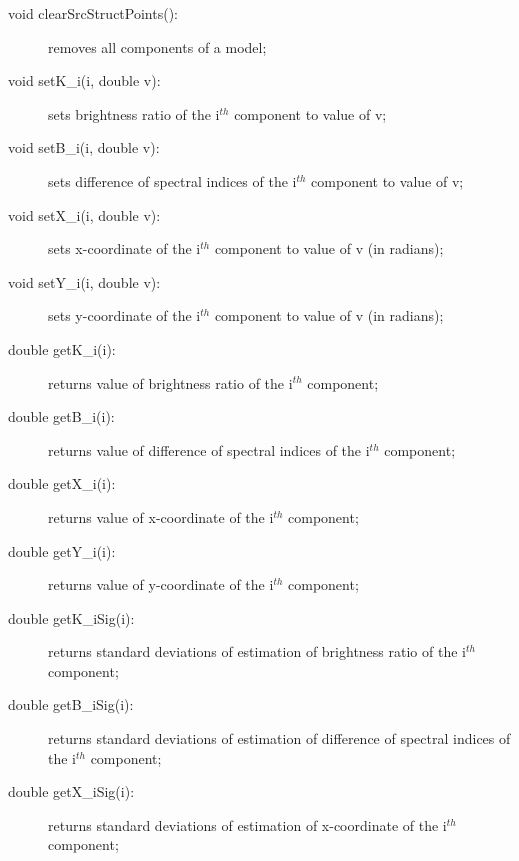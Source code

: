 \documentclass [10pt,letterpaper]{report}
\begin{document}
{{\begin{description}
\item[void clearSrcStructPoints():] removes all components of a model;

\item[void setK\_i(i, double v):] sets brightness ratio of the i$^{th}$ component to value of v;

\item[void setB\_i(i, double v):] sets difference of spectral indices of the i$^{th}$ component to value of v;

\item[void setX\_i(i, double v):] sets x-coordinate of the i$^{th}$ component to value of v (in radians);

\item[void setY\_i(i, double v):] sets y-coordinate of the i$^{th}$ component to value of v (in radians);

\item[double getK\_i(i):] returns value of brightness ratio of the i$^{th}$ component;

\item[double getB\_i(i):] returns value of difference of spectral indices of the i$^{th}$ component;

\item[double getX\_i(i):] returns value of x-coordinate of the i$^{th}$ component;

\item[double getY\_i(i):] returns value of y-coordinate of the i$^{th}$ component;

\item[double getK\_iSig(i):] returns standard deviations of estimation of brightness ratio of the i$^{th}$ component;

\item[double getB\_iSig(i):] returns standard deviations of estimation of difference of spectral indices of the i$^{th}$ component;

\item[double getX\_iSig(i):] returns standard deviations of estimation of x-coordinate of the i$^{th}$ component;


\end{description}}}
\end{document}
